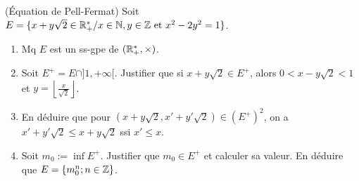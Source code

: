 
\begin{statementbox}
(Équation de Pell-Fermat) Soit $E = \{x + y\sqrt{2} \in \mathbb R_+^* / x \in \mathbb N, y \in \mathbb Z \text{ et } x^2 - 2y^2 = 1\}$.
\begin{enumerate}[label=\alph*)]
  \item Mq $E$ est un ss-gpe de $(\mathbb R_+^*, \times)$.
  \item Soit $E^+ = E \cap ]1, +\infty[$. Justifier que si $x + y\sqrt{2} \in E^+$, alors $0 < x - y\sqrt{2} < 1$ et $y = \left\lfloor \frac{x}{\sqrt{2}} \right\rfloor$.
  \item En déduire que pour $(x + y\sqrt{2}, x' + y'\sqrt{2}) \in (E^+)^2$, on a $x' + y'\sqrt{2} \leq x + y\sqrt{2}$ ssi $x' \leq x$.
  \item Soit $m_0 := \inf E^+$. Justifier que $m_0 \in E^+$ et calculer sa valeur. En déduire que $E = \{m_0^n ; n \in \mathbb Z\}$.
\end{enumerate}
\end{statementbox}

